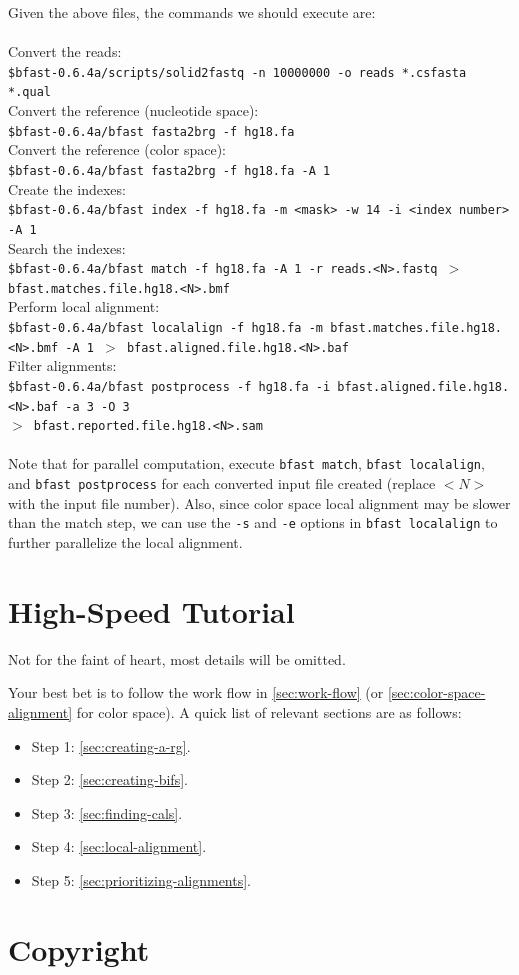 \documentclass[a4paper,12pt]{book}
\newcommand{\Version}{0.6.4a}
\newcommand{\TT}[1]{{\tt #1}} %
\begin{document}
Given the above files, the commands we should execute are:
\\\\
Convert the reads:\\
{\tt \scriptsize \$bfast-\Version{}/scripts/solid2fastq -n 10000000 -o reads *.csfasta *.qual\\}
Convert the reference (nucleotide space):\\
{\tt \scriptsize \$bfast-\Version{}/bfast fasta2brg -f hg18.fa\\}
Convert the reference (color space):\\
{\tt \scriptsize \$bfast-\Version{}/bfast fasta2brg -f hg18.fa -A 1 \\}
Create the indexes:\\
{\tt \scriptsize \$bfast-\Version{}/bfast index -f hg18.fa -m <mask> -w 14 -i <index number> -A 1\\}
Search the indexes:\\
{\tt \scriptsize \$bfast-\Version{}/bfast match -f hg18.fa -A 1 -r reads.<N>.fastq $>$ bfast.matches.file.hg18.<N>.bmf\\}
Perform local alignment:\\
{\tt \scriptsize \$bfast-\Version{}/bfast localalign -f hg18.fa -m bfast.matches.file.hg18.<N>.bmf -A 1 $>$ bfast.aligned.file.hg18.<N>.baf\\}
Filter alignments:\\
{\tt \scriptsize \$bfast-\Version{}/bfast postprocess -f hg18.fa -i bfast.aligned.file.hg18.<N>.baf -a 3 -O 3\\
$>$ bfast.reported.file.hg18.<N>.sam\\}
\\
Note that for parallel computation, execute {\tt bfast match}, {\tt bfast localalign}, and {\tt bfast postprocess} for each converted input file created (replace $<N>$ with the input file number).
Also, since color space local alignment may be slower than the match step, we can use the \TT{-s} and \TT{-e} options in {\tt bfast localalign} to further parallelize the local alignment.

\section{High-Speed Tutorial}
\label{sec:high-speed-tutorial}
Not for the faint of heart, most details will be omitted.

Your best bet is to follow the work flow in \autoref{sec:work-flow} (or \autoref{sec:color-space-alignment} for color space).
A quick list of relevant sections are as follows:
\begin{itemize}
	\item Step 1: \autoref{sec:creating-a-rg}.
	\item Step 2: \autoref{sec:creating-bifs}.
	\item Step 3: \autoref{sec:finding-cals}.
	\item Step 4: \autoref{sec:local-alignment}.
	\item Step 5: \autoref{sec:prioritizing-alignments}.
\end{itemize}
\section{Copyright}


{}


\end{document}

